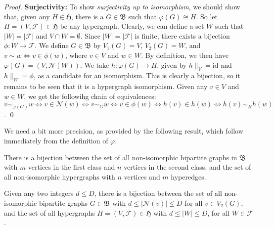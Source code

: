 \begin{proof}
\textbf{Surjectivity:}
To show \emph{surjectivity up to isomorphism}, we should show that, given any $H \in \mathfrak{H}$, there is a $G \in \mathfrak{B}$ such that $\varphi(G) \cong H$.
So let $H = (V, \mathcal{F}) \in \mathfrak{H}$ be any hypergraph.
Clearly, we can define a set $W$ such that $| W | = | \mathcal{F} |$ and $V \cap W = \emptyset$.
Since $| W | = | \mathcal{F} |$ is finite, there exists a bijection $\phi: W \rightarrow \mathcal{F}$.
We define $G \in \mathfrak{B}$ by $V_1(G) = V$, $V_2(G) = W$, and $v \sim w \Leftrightarrow v \in \phi(w)$, where $v \in V$ and $w \in W$.
By definition, we then have $\varphi(G) = (V, \mathcal{N}(W))$.
We take $h: \varphi(G) \rightarrow H$, given by $h \|_{V} = \text{id}$ and $h\|_{W} = \phi$, as a candidate for an isomorphism.
This is clearly a bijection, so it remains to be seen that it is a hypergraph isomorphism.
Given any $v \in V$ and $w \in W$, we get the followihg chain of equivalences:
$v \sim_{\varphi(G)} w \Leftrightarrow v \in \mathcal{N}(w) \Leftrightarrow v \sim_G w \Leftrightarrow v \in \phi(w) \Leftrightarrow h(v) \in h(w) \Leftrightarrow h(v) \sim_H h(w)$.
\qed
\end{proof}

We need a bit more precision, as provided by the following result, which follow immediately from the definition of $\varphi$.

\begin{corollary}
There is a bijection between the set of all non-isomorphic bipartite graphs in $\mathfrak{B}$ with $m$ vertices in the first class and $n$ vertices in the second class, and the set of all non-isomorphic hypergraphs with $n$ vertices and $m$ hyperedges.
\end{corollary}

\begin{corollary}
Given any two integers $d \leq D$, there is a bijection between the set of all non-isomorphic bipartite graphs $G \in \mathfrak{B}$ with $d \leq | \mathcal{N}(v) | \leq D$ for all $v \in V_2(G)$, and the set of all hypergraphs $H = (V, \mathcal{F}) \in \mathfrak{H}$ with $d \leq | W | \leq D$, for all $W \in \mathcal{F}$.
\end{corollary}
